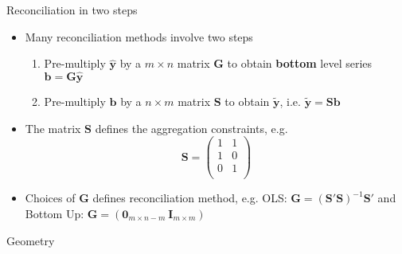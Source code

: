 \documentclass{beamer}
\begin{document}
  \begin{frame}{Reconciliation in two steps}
  	\begin{itemize}
  		\item Many reconciliation methods involve two steps
  		\begin{enumerate}
  			\item Pre-multiply $\hat{\bm y}$ by a $m\times n$ matrix $\bm G$ to obtain {\bf bottom} level series ${\bm b}={\bm G}{\hat{\bm y}}$ 
  			\item Pre-multiply ${\bm b}$ by a $n\times m$ matrix $\bm S$ to obtain ${\tilde{\bm y}}$, i.e. $\tilde{\bm y}={\bm S}{{\bm b}}$
  		\end{enumerate}
  	    \item The matrix ${\bm S}$ defines the aggregation constraints, e.g.
  	    \begin{equation*}
  	    {\bm S}=\begin{pmatrix} 1 &1 \\1 &0 \\0 &1 \\
  	    \end{pmatrix}
  	    \end{equation*}
  	    \item Choices of ${\bm G}$ defines reconciliation method, e.g. OLS: ${\bm G}=\left(\bm{S}'\bm{S}\right)^{-1}{\bm S'}$ and Bottom Up: ${\bm G}=\left(\bm{0}_{m\times n-m}~\bm{I}_{m\times m}\right)$ 
    \end{itemize}
  \end{frame}
  \begin{frame}{Geometry}
  	\vspace{-2.3cm}
  	\centering
  	
  \end{frame}
\end{document}
